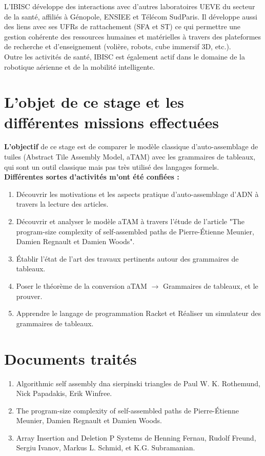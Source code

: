 \documentclass[12pt]{article}
\theoremstyle{definition}
\begin{document}
	L'IBISC développe des interactions avec d'autres laboratoires UEVE du secteur de la santé, affiliés à Génopole, ENSIEE et Télécom SudParis. Il développe aussi des liens avec ses UFRs de rattachement (SFA et ST) ce qui permettre une gestion cohérente des ressources humaines et matérielles à travers des plateformes de recherche et d’enseignement (volière, robots, cube immersif 3D, etc.).\\
	
	Outre les activités de santé, IBISC est également actif dans le domaine de la robotique aérienne et de la mobilité intelligente.\\
	
	
	\pagebreak
	\section{L'objet de ce stage et les différentes missions effectuées}
	\textbf{L'objectif} de ce stage est de comparer le modèle classique d'auto-assemblage de tuiles (Abstract Tile Assembly Model, aTAM) avec les grammaires de tableaux, qui sont un outil classique mais pas très utilisé des langages formels.\\
	
	\textbf{Différentes sortes d’activités m’ont été confiées :} 
	\begin{enumerate}
		\item Découvrir les motivations et les aspects pratique d'auto-assemblage d'ADN à travers la lecture des articles.
		\item Découvrir et analyser le modèle aTAM à travers l'étude de l'article "The program-size complexity of self-assembled paths de Pierre-Étienne Meunier, Damien Regnault et Damien Woods".
		\item Établir l'état de l'art des travaux pertinents autour des grammaires de tableaux.
		\item Poser le théorème de la conversion aTAM $\rightarrow$ Grammaires de tableaux, et le prouver.
		\item Apprendre le langage de programmation Racket et Réaliser un simulateur des grammaires de tableaux.
	\end{enumerate} 
	\section{Documents traités}
	\begin{enumerate}
		\item Algorithmic self assembly dna sierpinski triangles de Paul W. K. Rothemund, Nick Papadakis, Erik Winfree.
		\item The program-size complexity of self-assembled paths de Pierre-Étienne Meunier, Damien Regnault et Damien Woods.
		\item Array Insertion and Deletion P Systems de Henning Fernau, Rudolf Freund, Sergiu Ivanov, Markus L. Schmid, et K.G. Subramanian.
	\end{enumerate}
\end{document}
